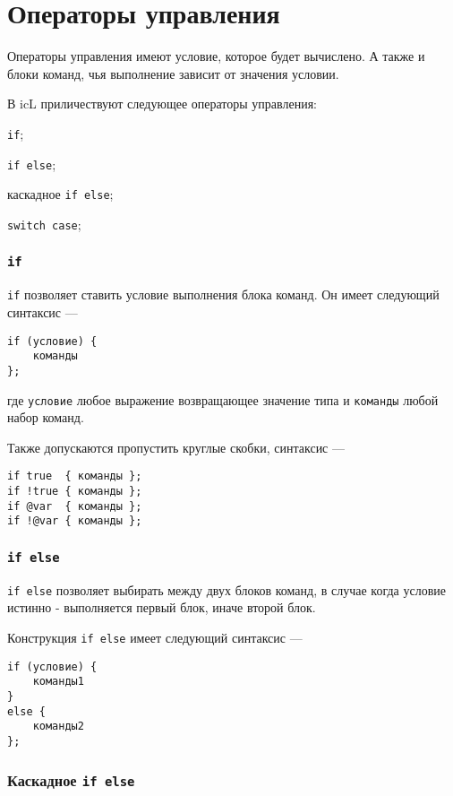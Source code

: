 \section{Операторы управления}

Операторы управления имеют условие, которое будет вычислено. А также и блоки команд, чья выполнение зависит от значения условии.

В icL приличествуют следующее операторы управления:
\begin{icItems}
	\item \texttt{if};
	\item \texttt{if else};
	\item каскадное \texttt{if else};
	\item \texttt{switch case};
\end{icItems}

\subsubsection{\texttt{if}}

\texttt{if} позволяет ставить условие выполнения блока команд. Он имеет следующий синтаксис —
\begin{verbatim}
if (условие) {
	команды
};
\end{verbatim}
где \texttt{условие} любое выражение возвращающее значение типа \bool{} и \texttt{команды} любой набор команд.

Также допускаются пропустить круглые скобки, синтаксис —
\begin{verbatim}
if true  { команды };
if !true { команды };
if @var  { команды };
if !@var { команды };
\end{verbatim}

\subsubsection{\texttt{if else}}

\texttt{if else} позволяет выбирать между двух блоков команд, в случае когда условие истинно - выполняется первый блок, иначе второй блок.

Конструкция \texttt{if else} имеет следующий синтаксис —
\begin{verbatim}
if (условие) {
	команды1
}
else {
	команды2
};
\end{verbatim}

\subsubsection{Каскадное \texttt{if else}}

